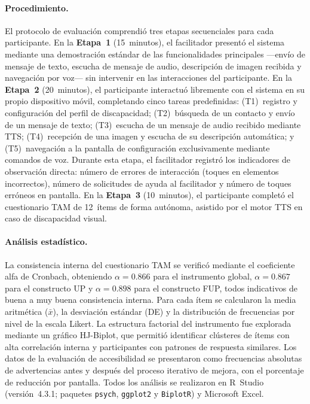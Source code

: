 \documentclass[journal]{IEEEtran}
\begin{document}
	\paragraph{Procedimiento.} El protocolo de evaluaci\'on comprendi\'o tres etapas secuenciales para cada participante. En la \textbf{Etapa~1} (15~minutos), el facilitador present\'o el sistema mediante una demostraci\'on est\'andar de las funcionalidades principales ---env\'io de mensaje de texto, escucha de mensaje de audio, descripci\'on de imagen recibida y navegaci\'on por voz--- sin intervenir en las interacciones del participante. En la \textbf{Etapa~2} (20~minutos), el participante interactu\'o libremente con el sistema en su propio dispositivo m\'ovil, completando cinco tareas predefinidas: (T1)~registro y configuraci\'on del perfil de discapacidad; (T2)~b\'usqueda de un contacto y env\'io de un mensaje de texto; (T3)~escucha de un mensaje de audio recibido mediante TTS; (T4)~recepci\'on de una imagen y escucha de su descripci\'on autom\'atica; y (T5)~navegaci\'on a la pantalla de configuraci\'on exclusivamente mediante comandos de voz. Durante esta etapa, el facilitador registr\'o los indicadores de observaci\'on directa: n\'umero de errores de interacci\'on (toques en elementos incorrectos), n\'umero de solicitudes de ayuda al facilitador y n\'umero de toques err\'oneos en pantalla. En la \textbf{Etapa~3} (10~minutos), el participante complet\'o el cuestionario TAM de 12~\'items de forma aut\'onoma, asistido por el motor TTS en caso de discapacidad visual.
	
	\paragraph{An\'alisis estad\'istico.} La consistencia interna del cuestionario TAM se verific\'o mediante el coeficiente alfa de Cronbach, obteniendo $\alpha=0.866$ para el instrumento global, $\alpha=0.867$ para el constructo UP y $\alpha=0.898$ para el constructo FUP, todos indicativos de buena a muy buena consistencia interna. Para cada \'item se calcularon la media aritm\'etica ($\bar{x}$), la desviaci\'on est\'andar (DE) y la distribuci\'on de frecuencias por nivel de la escala Likert. La estructura factorial del instrumento fue explorada mediante un gr\'afico HJ-Biplot, que permiti\'o identificar cl\'usteres de \'items con alta correlaci\'on interna y participantes con patrones de respuesta similares. Los datos de la evaluaci\'on de accesibilidad se presentaron como frecuencias absolutas de advertencias antes y despu\'es del proceso iterativo de mejora, con el porcentaje de reducci\'on por pantalla. Todos los an\'alisis se realizaron en R~Studio (versi\'on~4.3.1; paquetes \texttt{psych}, \texttt{ggplot2} y \texttt{BiplotR}) y Microsoft Excel.
	
\end{document}
